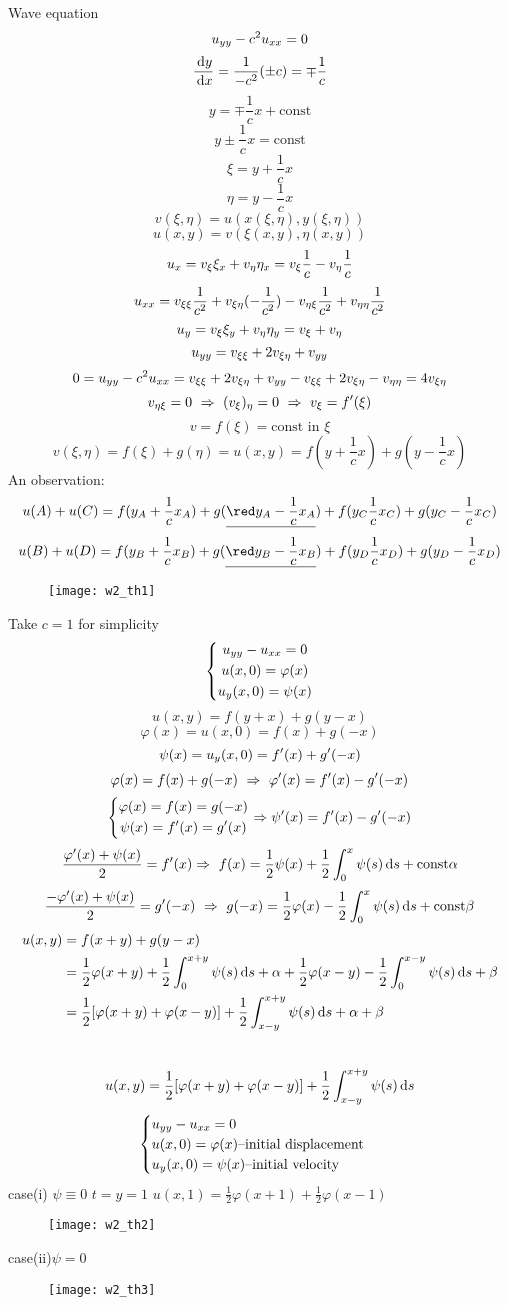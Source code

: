 Wave equation
\[u_{yy}-c^2u_{xx}=0
\]
\[\frac{\,\mathrm{d} y}{\,\mathrm{d} x}=\frac{1}{-c^2}(\pm c)=\mp\frac{1}{c}
\]
\[y=\mp\frac{1}{c}x+\text{const}
\]
\[y\pm\frac{1}{c}x=\text{const}
\]
\[\xi=y+\frac{1}{c}x
\]
\[\eta=y-\frac{1}{c}x
\]
\[v(\xi,\eta)=u(x(\xi,\eta),y(\xi,\eta))
\]
\[u(x,y)=v(\xi(x,y),\eta(x,y))
\]
\[u_x=v_{\xi}\xi_{x}+v_\eta\eta_x=v_{\xi}\frac{1}{c}-v_\eta\frac{1}{c}
\]
\[u_{xx}=v_{\xi\xi}\frac{1}{c^2}+v_{\xi\eta}(-\frac{1}{c^2})-v_{\eta\xi}\frac{1}{c^2}+v_{\eta\eta}\frac{1}{c^2}
\]
\[u_y=v_\xi\xi_y+v_\eta\eta_y=v_\xi+v_\eta
\]
\[u_{yy}=v_{\xi\xi}+2v_{\xi\eta}+v_{yy}
\]
\[0=u_{yy}-c^2u_{xx}=v_{\xi\xi}+2v_{\xi\eta}+v_{yy}-v_{\xi\xi}+2v_{\xi\eta}-v_{\eta\eta}=4v_{\xi\eta}
\]
\[v_{\eta\xi}=0~\Rightarrow~(v_\xi)_\eta=0~\Rightarrow ~v_\xi=f^{\prime}(\xi)
\]
\[v=f(\xi)=\text{const in }\xi
\]
\[v(\xi,\eta)=f(\xi)+g(\eta)=u(x,y)=f(y+\frac{1}{c}x)+g(y-\frac{1}{c}x)
\]
An observation:
\[u(A)+u(C)=f(y_A+\frac{1}{c}x_A)+g(\underline{\red y_A-\frac{1}{c}x_A})+f(y_C\frac{1}{c}x_C)+g(y_C-\frac{1}{c}x_C)
\]
\[u(B)+u(D)=f(y_B+\frac{1}{c}x_B)+g(\underline{\red y_B-\frac{1}{c}x_B})+f(y_D\frac{1}{c}x_D)+g(y_D-\frac{1}{c}x_D)
\]
\begin{figure}[H]
\centering
\texttt{[image: w2\_th1]}
\end{figure}
Take $c=1$ for simplicity
\[\left\{\begin{gathered}u_{yy}-u_{xx}=0\\u(x,0)=\varphi(x)\\u_y(x,0)=\psi(x)\end{gathered}\right.
\]
\[u(x,y)=f(y+x)+g(y-x)
\]
\[\varphi(x)=u(x,0)=f(x)+g(-x)
\]
\[\psi(x)=u_y(x,0)=f^{\prime}(x)+g^{\prime}(-x)
\]
\[\varphi(x)=f(x)+g(-x)~\Rightarrow~\varphi^{\prime}(x)=f^{\prime}(x)-g^{\prime}(-x)
\]
\[\left\{\begin{gathered}\varphi(x)=f(x)=g(-x)\\\psi(x)=f^{\prime}(x)=g^{\prime}(x)\end{gathered}\right.\Rightarrow \psi^{\prime}(x)=f^{\prime}(x)-g^{\prime}(-x)
\]
\[\frac{\varphi^{\prime}(x)+\psi(x)}{2}=f^{\prime}(x)\Rightarrow~f(x)=\frac{1}{2}\psi(x)+\frac{1}{2}\int_0^x\psi(s)\,\mathrm{d} s+\text{const}\alpha
\]
\[\frac{-\varphi^{\prime}(x)+\psi(x)}{2}=g^{\prime}(-x)~\Rightarrow~g(-x)=\frac{1}{2}\varphi(x)-\frac{1}{2}\int_0^x\psi(s)\,\mathrm{d} s+\text{const}\beta
\]
\[\begin{aligned}u(x,y)&=f(x+y)+g(y-x)\\&=\frac{1}{2}\varphi(x+y)+\frac{1}{2}\int_0^{x+y}\psi(s)\,\mathrm{d} s+\alpha+\frac{1}{2}\varphi(x-y)-\frac{1}{2}\int_0^{x-y}\psi(s)\,\mathrm{d} s+\beta\\&=\frac{1}{2}[\varphi(x+y)+\varphi(x-y)]+\frac{1}{2}\int_{x-y}^{x+y}\psi(s)\,\mathrm{d} s+\alpha+\beta\end{aligned}
\]
\\
\[u(x,y)=\frac{1}{2}[\varphi(x+y)+\varphi(x-y)]+\frac{1}{2}\int_{x-y}^{x+y}\psi(s)\,\mathrm{d} s
\]
\[\begin{cases}u_{yy}-u_{xx}=0\\u(x,0)=\varphi(x)\text{--initial displacement}\\u_y(x,0)=\psi(x)\text{--initial velocity}\end{cases}
\]
case(i) $\psi\equiv0$ $t=y=1$ $u(x,1)=\frac{1}{2}\varphi(x+1)+\frac{1}{2}\varphi(x-1)$
\begin{figure}[H]
\centering
\texttt{[image: w2\_th2]}
\end{figure}
case(ii)$\psi=0$
\begin{figure}[H]
\centering
\texttt{[image: w2\_th3]}
\end{figure}